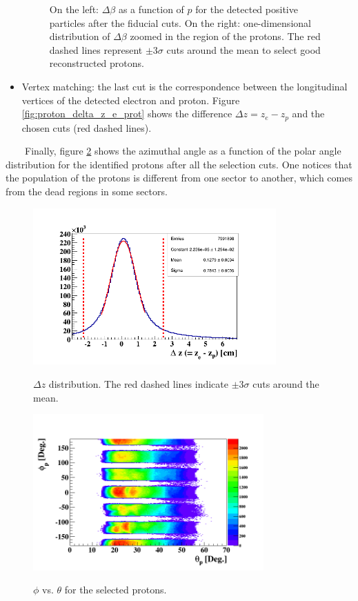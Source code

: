 \begin{itemize}
\begin{figure}[tbp]
\caption{On the left: $\Delta \beta$ as a function of $p$ for the detected positive particles after the fiducial cuts. On the right: one-dimensional distribution of $\Delta \beta$ zoomed in the region of the protons. The red dashed lines represent $\pm$3$\sigma$ cuts around the mean to select good reconstructed protons.} 
\label{fig:proton_delta_beta_cuts}
\end{figure}

\item Vertex matching:  the last cut is the correspondence between the longitudinal vertices of the detected electron and proton. Figure \ref{fig:proton_delta_z_e_prot} shows the difference $\Delta z = z_{e} - z_{p}$ and the chosen cuts (red dashed lines).
\end{itemize}
~~~~Finally, figure \ref{fig:prot_Theta_Phi} shows the azimuthal angle as a function of the polar angle distribution for the identified protons after all the selection cuts. One notices that the population of the protons is different from one sector to another, which comes from the dead regions in some sectors.
\vspace{-0.1in}
 
\begin{figure}[tbp]
\begin{minipage}[c]{.46\linewidth}
\hspace{-0.3in}
\includegraphics[height=6.0cm]{fig_analysis/proton_delta_z_e_prot.png}
\caption{$\Delta z$ distribution. The red dashed lines indicate $\pm$3$\sigma$ cuts around the mean. } 
\label{fig:proton_delta_z_e_prot}
\end{minipage} \hfill
\begin{minipage}[c]{.46\linewidth}
\hspace{-0.3in}
\includegraphics[height=6.0cm]{fig_analysis/prot_Theta_Phi_2.png}
\caption{$\phi$ vs. $\theta$ for the selected protons.}
\vspace{0.2in}
\label{fig:prot_Theta_Phi}
\end{minipage}
\end{figure}

